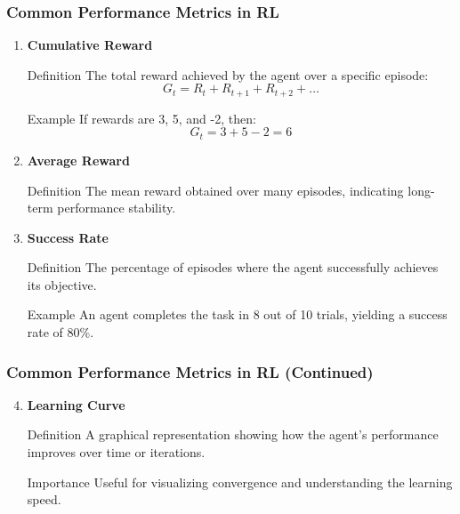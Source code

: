 \documentclass[aspectratio=169]{beamer}
\begin{document}
\begin{frame}[fragile]
    \frametitle{Common Performance Metrics in RL}
    \begin{enumerate}
        \item \textbf{Cumulative Reward}
            \begin{block}{Definition}
                The total reward achieved by the agent over a specific episode:
                \begin{equation}
                    G_t = R_t + R_{t+1} + R_{t+2} + \ldots
                \end{equation}
            \end{block}
            \begin{block}{Example}
                If rewards are 3, 5, and -2, then:
                \[
                G_t = 3 + 5 - 2 = 6
                \]
            \end{block}
        \item \textbf{Average Reward}
            \begin{block}{Definition}
                The mean reward obtained over many episodes, indicating long-term performance stability.
            \end{block}
        \item \textbf{Success Rate}
            \begin{block}{Definition}
                The percentage of episodes where the agent successfully achieves its objective.
            \end{block}
            \begin{block}{Example}
                An agent completes the task in 8 out of 10 trials, yielding a success rate of 80\%.
            \end{block}
    \end{enumerate}
\end{frame}

\begin{frame}[fragile]
    \frametitle{Common Performance Metrics in RL (Continued)}
    \begin{enumerate}
        \setcounter{enumi}{3}
        \item \textbf{Learning Curve}
            \begin{block}{Definition}
                A graphical representation showing how the agent's performance improves over time or iterations.
            \end{block}
            \begin{block}{Importance}
                Useful for visualizing convergence and understanding the learning speed.
            \end{block}
    \end{enumerate}
\end{frame}
\end{document}
